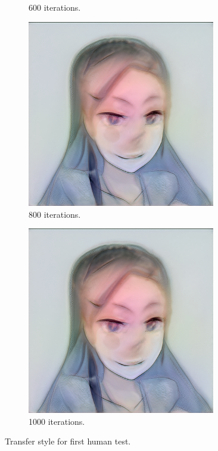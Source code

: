 \documentclass[conference]{IEEEtran}
\theoremstyle{definition}
\theoremstyle{remark}
\theoremstyle{remark}
\begin{document}
\begin{figure}
\begin{subfigure}[b]{0.15\textwidth}
    \caption{600 iterations.}
  \end{subfigure}
  \begin{subfigure}[b]{0.15\textwidth}
    \centering \includegraphics[width=0.9\textwidth]{figs/anime-deipols-4.png}
    \caption{800 iterations.}
  \end{subfigure}
  \begin{subfigure}[b]{0.15\textwidth}
    \centering \includegraphics[width=0.9\textwidth]{figs/anime-deipols-5.png}
    \caption{1000 iterations.}
  \end{subfigure}
  \caption{Transfer style for first human test.}
  \label{fig:ts-anime1}
\end{figure}
\end{document}

